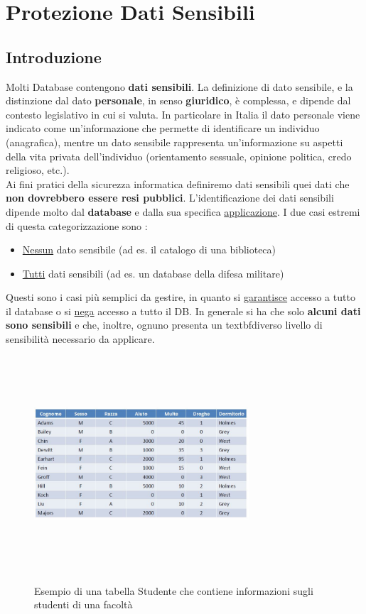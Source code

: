 \chapter{Protezione Dati Sensibili}

\section{Introduzione}
Molti Database contengono \textbf{dati sensibili}. La definizione di dato sensibile, e la distinzione dal dato \textbf{personale}, in senso \textbf{giuridico}, è complessa, e dipende dal contesto legislativo in cui si valuta. In particolare in Italia il dato personale viene indicato come un'informazione che permette di identificare un individuo (anagrafica), mentre un dato sensibile rappresenta un'informazione su aspetti della vita privata dell'individuo (orientamento sessuale, opinione politica, credo religioso, etc.). \\

Ai fini pratici della sicurezza informatica definiremo dati sensibili quei dati che \textbf{non dovrebbero essere resi pubblici}. L'identificazione dei dati sensibili dipende molto dal \textbf{database} e dalla sua specifica \underline{applicazione}. I due casi estremi di questa categorizzazione sono : 
\begin{itemize}
\item \underline{Nessun} dato sensibile (ad es. il catalogo di una biblioteca)
\item \underline{Tutti} dati sensibili (ad es. un database della difesa militare)
\end{itemize}
Questi sono i casi più semplici da gestire, in quanto si \underline{garantisce} accesso a tutto il database o si \underline{nega} accesso a tutto il DB. In generale si ha che solo \textbf{alcuni dati sono sensibili} e che, inoltre, ognuno presenta un textbf{diverso livello di sensibilità} necessario da applicare.

\begin{figure}[htbp]
	\centering
	{\includegraphics[height=8cm, width=8cm, keepaspectratio]{Immagini/dati_sensibili/prot_dati_01.JPG}}
	\caption{Esempio di una tabella Studente che contiene informazioni sugli studenti di una facoltà\label{fig:tabella_db}}
\end{figure}

